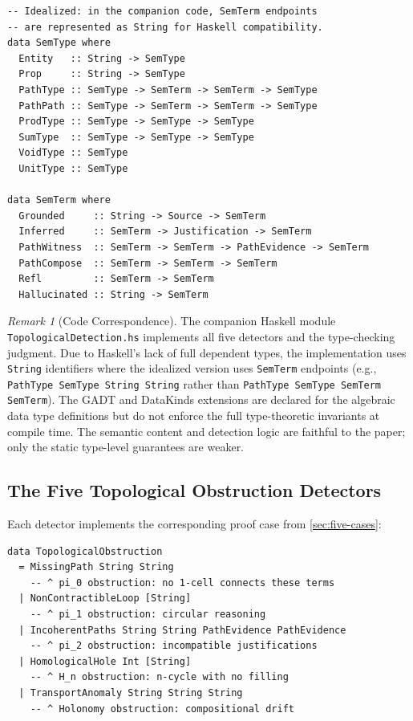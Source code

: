 \documentclass[11pt,a4paper]{article}
\theoremstyle{plain}
\theoremstyle{definition}
\theoremstyle{remark}
\newtheorem{remark}[theorem]{Remark}
\begin{document}
\begin{lstlisting}[caption={Semantic types and terms (idealized GADT encoding).}]
-- Idealized: in the companion code, SemTerm endpoints
-- are represented as String for Haskell compatibility.
data SemType where
  Entity   :: String -> SemType
  Prop     :: String -> SemType
  PathType :: SemType -> SemTerm -> SemTerm -> SemType
  PathPath :: SemType -> SemTerm -> SemTerm -> SemType
  ProdType :: SemType -> SemType -> SemType
  SumType  :: SemType -> SemType -> SemType
  VoidType :: SemType
  UnitType :: SemType

data SemTerm where
  Grounded     :: String -> Source -> SemTerm
  Inferred     :: SemTerm -> Justification -> SemTerm
  PathWitness  :: SemTerm -> SemTerm -> PathEvidence -> SemTerm
  PathCompose  :: SemTerm -> SemTerm -> SemTerm
  Refl         :: SemTerm -> SemTerm
  Hallucinated :: String -> SemTerm
\end{lstlisting}

\begin{remark}[Code Correspondence]
\label{rem:code-correspondence}
The companion Haskell module \texttt{TopologicalDetection.hs} implements all five detectors and the type-checking judgment. Due to Haskell's lack of full dependent types, the implementation uses \texttt{String} identifiers where the idealized version uses \texttt{SemTerm} endpoints (e.g., \texttt{PathType SemType String String} rather than \texttt{PathType SemType SemTerm SemTerm}). The GADT and DataKinds extensions are declared for the algebraic data type definitions but do not enforce the full type-theoretic invariants at compile time. The semantic content and detection logic are faithful to the paper; only the static type-level guarantees are weaker.
\end{remark}

\subsection{The Five Topological Obstruction Detectors}

Each detector implements the corresponding proof case from \cref{sec:five-cases}:

\begin{lstlisting}[caption={Topological obstruction types (companion code uses String).}]
data TopologicalObstruction
  = MissingPath String String
    -- ^ pi_0 obstruction: no 1-cell connects these terms
  | NonContractibleLoop [String]
    -- ^ pi_1 obstruction: circular reasoning
  | IncoherentPaths String String PathEvidence PathEvidence
    -- ^ pi_2 obstruction: incompatible justifications
  | HomologicalHole Int [String]
    -- ^ H_n obstruction: n-cycle with no filling
  | TransportAnomaly String String String
    -- ^ Holonomy obstruction: compositional drift
\end{lstlisting}
\end{document}
